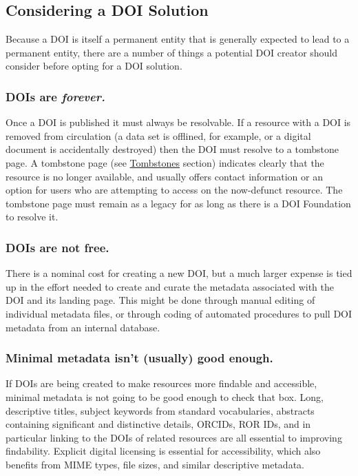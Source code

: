 \documentclass[11pt,a4paper]{ivoa}
\begin{document}
\subsection{Considering a DOI Solution}\hypertarget{considering-a-doi-solution}{}\label{sec:considering-a-doi-solution}

Because a DOI is itself a permanent entity that is generally expected to lead to a permanent entity, there are a number of things a potential DOI creator should consider before opting for a DOI solution.

\subsubsection{DOIs are \emph{forever.}}\hypertarget{dois-are-forever}{}\label{sec:dois-are-forever}

Once a DOI is published it must always be resolvable. If a resource with a DOI is removed from circulation (a data set is offlined, for example, or a digital document is accidentally destroyed) then the DOI must resolve to a tombstone page. A tombstone page (see \hyperlink{tombstones}{Tombstones} section) indicates clearly that the resource is no longer available, and usually offers contact information or an option for users who are attempting to access on the now-defunct resource. The tombstone page must remain as a legacy for as long as there is a DOI Foundation to resolve it.

\subsubsection{DOIs are not free.}\hypertarget{dois-are-not-free}{}\label{sec:dois-are-not-free}

There is a nominal cost for creating a new DOI, but a much larger expense is tied up in the effort needed to create and curate the metadata associated with the DOI and its landing page. This might be done through manual editing of individual metadata files, or through coding of automated procedures to pull DOI metadata from an internal database.

\subsubsection{Minimal metadata isn't (usually) good enough.}\hypertarget{minimal-metadata-isnt-usually-good-enough}{}\label{sec:minimal-metadata-isnt-usually-good-enough}

If DOIs are being created to make resources more findable and accessible, minimal metadata is not going to be good enough to check that box. Long, descriptive titles, subject keywords from standard vocabularies, abstracts containing significant and distinctive details, ORCIDs, ROR IDs, and in particular linking to the DOIs of related resources are all essential to improving findability. Explicit digital licensing is essential for accessibility, which also benefits from MIME types, file sizes, and similar descriptive metadata.
\end{document}
